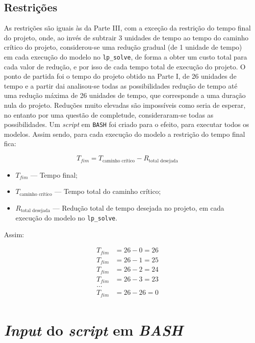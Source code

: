 \subsection{Restrições}

As restrições são iguais às da Parte III, com a exceção da restrição do tempo
final do projeto, onde, ao invés de subtrair 3 unidades de tempo ao tempo do
caminho crítico do projeto, considerou-se uma redução gradual (de 1 unidade de
tempo) em cada execução do modelo no \texttt{lp\_solve}, de forma a obter um
custo total para cada valor de redução, e por isso de cada tempo total de
execução do projeto. O ponto de partida foi o tempo do projeto obtido na Parte
I, de 26 unidades de tempo e a partir dai analisou-se todas as possibilidades
redução de tempo até uma redução máxima de 26 unidades de tempo, que corresponde
a uma duração nula do projeto. Reduções muito elevadas são impossíveis como
seria de esperar, no entanto por uma questão de completude, consideraram-se
todas as possibilidades. Um \emph{script} em \texttt{BASH} foi criado para
o efeito, para executar todos os modelos. Assim sendo, para cada execução do
modelo a restrição do tempo final fica:

$$ T_{fim} = T_{\text{caminho crítico}} - R_{\text{total desejada}}$$


\begin{itemize} 
	
	\item $T_{fim}$ --- Tempo final;
	\item $T_{\text{caminho crítico}}$ --- Tempo total do caminho crítico;
	\item $R_{\text{total desejada}}$ --- Redução total de tempo desejada no projeto,
		em cada execução do modelo no \texttt{lp\_solve}.

\end{itemize}

Assim:

\begin{align*}	
	 T_{fim}& = 26 - 0 = 26\\
	 T_{fim}& = 26 - 1 = 25\\
	 T_{fim}& = 26 - 2 = 24\\
	 T_{fim}& = 26 - 3 = 23\\
	  \dots     & \\
	 T_{fim}& = 26 - 26 = 0\\
\end{align*}

\section{\emph{Input} do \emph{script} em \emph{BASH}}

